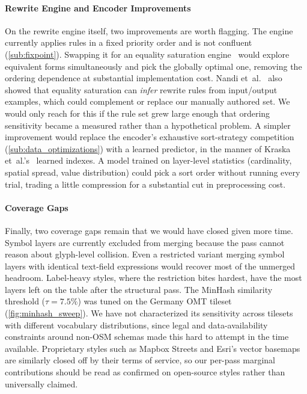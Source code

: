 \paragraph{Rewrite Engine and Encoder Improvements}
On the rewrite engine itself, two improvements are worth flagging.
The engine currently applies rules in a fixed priority order and is not confluent (\cref{sub:fixpoint}).
Swapping it for an equality saturation engine~\cite{tateEqualitySaturationNew2009,willseyEggFastExtensible2021} would explore equivalent forms simultaneously and pick the globally optimal one, removing the ordering dependence at substantial implementation cost.
Nandi et~al.~\cite{nandiRewriteRuleInference2021} also showed that equality saturation can \emph{infer} rewrite rules from input/output examples, which could complement or replace our manually authored set.
We would only reach for this if the rule set grew large enough that ordering sensitivity became a measured rather than a hypothetical problem.
A simpler improvement would replace the encoder's exhaustive sort-strategy competition (\cref{sub:data_optimizations}) with a learned predictor, in the manner of Kraska et~al.'s~\cite{kraskaCaseLearnedIndex2018} learned indexes.
A model trained on layer-level statistics (cardinality, spatial spread, value distribution) could pick a sort order without running every trial, trading a little compression for a substantial cut in preprocessing cost.

\paragraph{Coverage Gaps}
Finally, two coverage gaps remain that we would have closed given more time.
Symbol layers are currently excluded from merging because the pass cannot reason about glyph-level collision.
Even a restricted variant merging symbol layers with identical text-field expressions would recover most of the unmerged headroom.
Label-heavy styles, where the restriction bites hardest, have the most layers left on the table after the structural pass.
The MinHash similarity threshold ($\tau = 7.5\%$) was tuned on the Germany \ac{OMT} tileset (\cref{fig:minhash_sweep}).
We have not characterized its sensitivity across tilesets with different vocabulary distributions, since legal and data-availability constraints around non-\ac{OSM} schemas made this hard to attempt in the time available.
Proprietary styles such as Mapbox Streets and Esri's vector basemaps are similarly closed off by their terms of service, so our per-pass marginal contributions should be read as confirmed on open-source styles rather than universally claimed.
